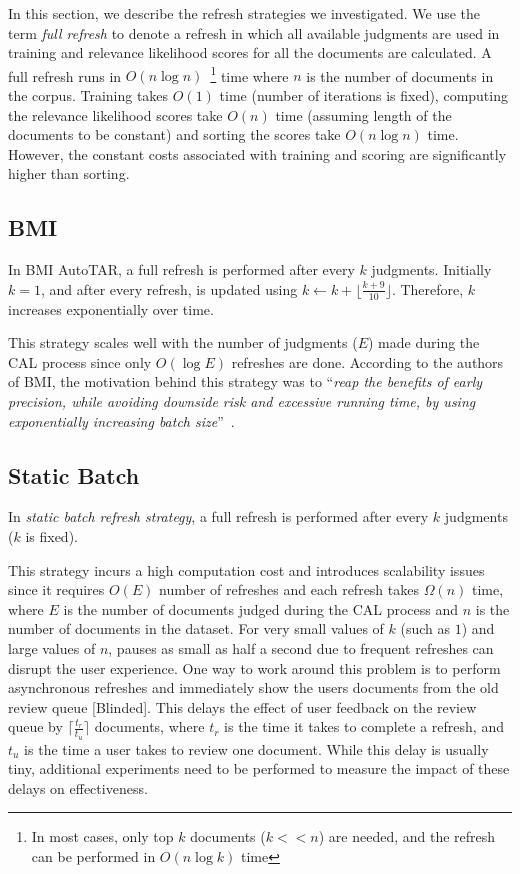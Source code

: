 \label{chap:refresh}
In this section, we describe the refresh strategies we investigated. We use the
term \textit{full refresh} to denote a refresh in which all available judgments
are used in training and relevance likelihood scores for all the documents are
calculated. A full refresh runs in $O(n\log n)$~\footnote{In most cases, only
    top $k$ documents ($k<<n$) are needed, and the refresh can be performed in $O(n \log k)$ time} time where $n$ is the
number of documents in the corpus. Training takes $O(1)$ time (number of iterations
is fixed), computing the relevance likelihood scores take $O(n)$ time (assuming
length of
the documents to be constant) and sorting the scores take $O(n \log n)$ time. However,
the constant costs associated with training and scoring are significantly higher
than sorting.

\subsection*{BMI}

In BMI AutoTAR, a full refresh is performed after every $k$ judgments. Initially $k=1$, and
after every refresh, is updated using $k \leftarrow k + \lfloor\frac{k +
9}{10}\rfloor$. Therefore, $k$ increases exponentially over time.

This strategy scales well with the number of judgments ($E$) made during the CAL
process since only $O(\log E)$ refreshes are done. According to the authors of
BMI, the motivation behind this strategy was to ``\textit{reap the benefits of
    early precision, while avoiding downside risk and excessive running time, by
using exponentially increasing batch size}''~\cite{cormack2015autonomy}.


\subsection*{Static Batch}

In \textit{static batch refresh strategy}, a full refresh is performed after every $k$ judgments ($k$ is fixed).

This strategy incurs a high computation cost and introduces scalability issues
since it requires $O(E)$ number of refreshes and each refresh takes $\Omega(n)$
time, where $E$ is the number of documents judged during the CAL process and
$n$ is the number of documents in the dataset. For very small values of $k$
(such as $1$) and large values of $n$, pauses as small as half a second due to
frequent refreshes can disrupt the user experience. One way to work around this
problem is to perform asynchronous refreshes and immediately show the users
documents from the old review queue [Blinded]. This delays the effect of user
feedback on the review queue by $\lceil\frac{t_r}{t_u}\rceil$ documents, where
$t_r$ is the time it takes to complete a refresh, and $t_u$ is the time a user
takes to review one document. While this delay is usually tiny, additional
experiments need to be performed to measure the impact of these delays on
effectiveness.

